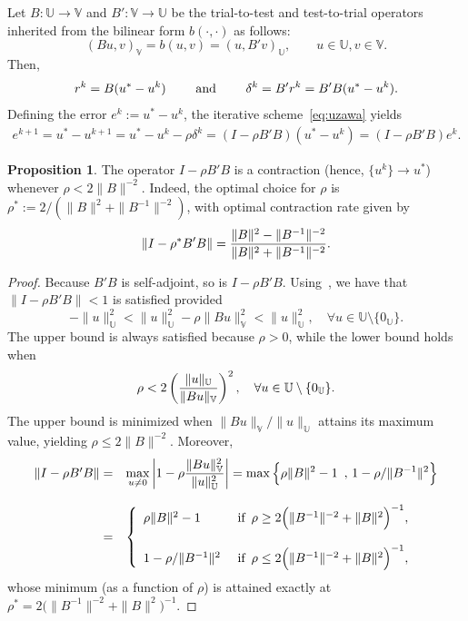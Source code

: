 \documentclass{article}
\theoremstyle{definition}
\newtheorem{proposition}{Proposition}
\begin{document}
Let $B:\mathbb{U}\longrightarrow \mathbb{V}$ and $B':\mathbb{V}\longrightarrow \mathbb{U}$ be the trial-to-test and test-to-trial operators inherited from the bilinear form $b(\cdot,\cdot)$ as follows: 
\begin{equation}
    (Bu,v)_\mathbb{V} = b(u,v) = (u,B'v)_\mathbb{U},\qquad u\in\mathbb{U},v\in\mathbb{V}.
\end{equation} 
Then,
$$
r^k=B(u^*-u^k) \qquad\hbox{ and }\qquad \delta^k=B'r^k=B'B(u^*-u^k).
$$
Defining the error $e^k := u^*-u^k$, the iterative scheme~\eqref{eq:uzawa} yields
\begin{align}\label{eq:contraction}
e^{k+1}=u^*-u^{k+1}= u^*-u^{k} -\rho\delta^k=(I-\rho B'B)(u^*-u^k) =(I-\rho B'B)e^k.
\end{align} 
%
\begin{proposition}\label{prop:contraction}
    The operator $I-\rho B'B$ is a contraction (hence, $\{u^k\}\to u^*$) whenever $\rho <2 \|B\|^{-2}$.
Indeed, the optimal choice for $\rho$ is $\rho^*:=2/(\|B\|^2+\|B^{-1}\|^{-2})$, with optimal contraction rate given by
    $$
\|I-\rho^*B'B\|={\|B\|^2-\|B^{-1}\|^{-2}\over\|B\|^2+\|B^{-1}\|^{-2}}.
$$
\end{proposition}
%
\begin{proof}
Because $B'B$ is self-adjoint, so is $I-\rho B'B$. Using~\cite[Proposition~6.9]{Brezis2010}, we have that $\|I-\rho B'B\|<1$ is satisfied provided 
$$
-\|u\|_\mathbb U^2 < \|u\|_\mathbb U^2 -\rho \|Bu\|_\mathbb V^2 <\|u\|_\mathbb U^2, \quad\forall u\in\mathbb U\setminus\{0_\mathbb U\}.
$$
The upper bound is always satisfied because $\rho>0$, while the lower bound holds when
$$
\rho<2\left({\|u\|_\mathbb U\over\|Bu\|_\mathbb V}\right)^2,\quad\forall u\in\mathbb U\setminus\{0_\mathbb U\}.
$$
The upper bound is minimized when $\|Bu\|_\mathbb V/\|u\|_\mathbb U$ attains its maximum value, yielding $\rho \leq 2\|B\|^{-2}$.
Moreover,
$$
\begin{array}{rl}
\|I-\rho B'B\|= & \displaystyle\max_{u\neq 0}\left| 1-\rho {\|Bu\|_{\mathbb V}^2\over \|u\|_\mathbb U^2}\right|=
\max\Big\{
\rho \|B\|^2-1\,~,\,1-\rho/\|B^{-1}\|^{2}\Big\}\\\\
= & 
\left\{
\begin{array}{ll}
\rho\|B\|^2-1 & \hbox{ if }\, \rho \ge 2\Big(\|B^{-1}\|^{-2}+\|B\|^2\Big)^{-1},\\\\
1-\rho/\|B^{-1}\|^{2} & \hbox{ if }\, \rho \le 2\Big(\|B^{-1}\|^{-2}+\|B\|^2\Big)^{-1},
\end{array}\right.
\end{array}
$$
whose minimum (as a function of $\rho$) is attained exactly at $\rho^*=2\Big(\|B^{-1}\|^{-2}+\|B\|^2\Big)^{-1}$. 
\end{proof}
\end{document}
